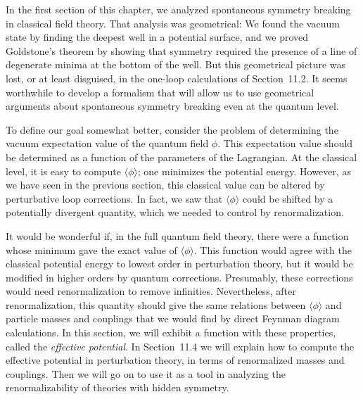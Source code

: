 In the first section of this chapter, we analyzed spontaneous symmetry
breaking in classical field theory.  That analysis was geometrical: We found
the vacuum state by finding the deepest well in a potential surface, and we
proved Goldstone's theorem by showing that symmetry required the presence of
a line of degenerate minima at the bottom of the well.  But this geometrical
picture was lost, or at least disguised, in the one-loop calculations of
Section~11.2.  It seems worthwhile to develop a formalism that will allow us
to use geometrical arguments about spontaneous symmetry breaking even at the
quantum level.

To define our goal somewhat better, consider the problem of determining the
vacuum expectation value of the quantum field $\phi$.  This expectation value
should be determined as a function of the parameters of the Lagrangian.  At
the classical level, it is easy to compute $\langle\phi\rangle$; one minimizes
the potential energy.  However, as we have seen in the previous section, this
classical value can be altered by perturbative loop corrections.  In fact, we
saw that $\langle\phi\rangle$ could be shifted by a potentially divergent
quantity, which we needed to control by renormalization.

It would be wonderful if, in the full quantum field theory, there were a
function whose minimum gave the exact value of $\langle\phi\rangle$.  This
function would agree with the classical potential energy to lowest order in
perturbation theory, but it would be modified in higher orders by quantum
corrections.  Presumably, these corrections would need renormalization to
remove infinities.  Nevertheless, after renormalization, this quantity should
give the same relations between $\langle\phi\rangle$ and particle masses and
couplings that we would find by direct Feynman diagram calculations.  In this
section, we will exhibit a function with these properties, called the
\emph{effective potential}.  In Section~11.4 we will explain how to compute
the effective potential in perturbation theory, in terms of renormalized
masses and couplings.  Then we will go on to use it as a tool in analyzing the
renormalizability of theories with hidden symmetry.

